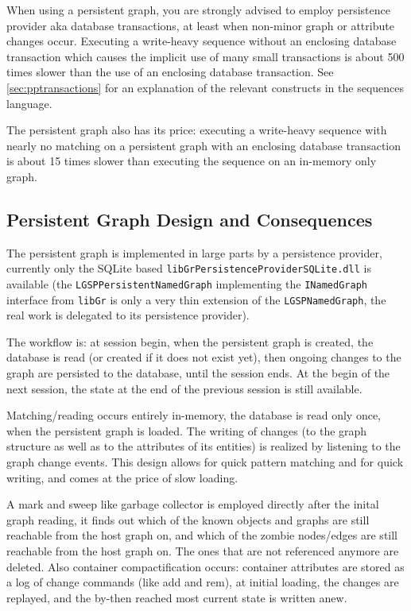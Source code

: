 \begin{warning}
When using a persistent graph, you are strongly advised to employ persistence provider aka database transactions, at least when non-minor graph or attribute changes occur.
Executing a write-heavy sequence without an enclosing database transaction which causes the implicit use of many small transactions is about 500 times slower than the use of an enclosing database transaction.
See \ref{sec:pptransactions} for an explanation of the relevant constructs in the sequences language.
\end{warning}

\begin{note}
The persistent graph also has its price: executing a write-heavy sequence with nearly no matching on a persistent graph with an enclosing database transaction is about 15 times slower than executing the sequence on an in-memory only graph.
\end{note}

\subsection*{Persistent Graph Design and Consequences}
The persistent graph is implemented in large parts by a persistence provider, currently only the SQLite based \texttt{libGrPersistenceProviderSQLite.dll} is available (the \texttt{LGSP\-Persistent\-Named\-Graph} implementing the \texttt{INamedGraph} interface from \texttt{libGr} is only a very thin extension of the \texttt{LGSPNamedGraph}, the real work is delegated to its persistence provider). 

The workflow is: at session begin, when the persistent graph is created, the database is read (or created if it does not exist yet), then ongoing changes to the graph are persisted to the database, until the session ends.
At the begin of the next session, the state at the end of the previous session is still available.

Matching/reading occurs entirely in-memory, the database is read only once, when the persistent graph is loaded.
The writing of changes (to the graph structure as well as to the attributes of its entities) is realized by listening to the graph change events.
This design allows for quick pattern matching and for quick writing, and comes at the price of slow loading.

A mark and sweep like garbage collector is employed directly after the inital graph reading, it finds out which of the known objects and graphs are still reachable from the host graph on, and which of the zombie nodes/edges are still reachable from the host graph on.
The ones that are not referenced anymore are deleted.
Also container compactification occurs: container attributes are stored as a log of change commands (like add and rem), at initial loading, the changes are replayed, and the by-then reached most current state is written anew.

